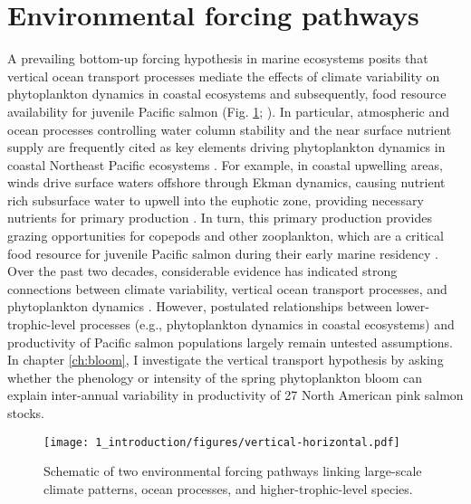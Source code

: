 

\section{Environmental forcing pathways}

A prevailing bottom-up forcing hypothesis in marine ecosystems posits that
vertical ocean transport processes mediate the effects of climate variability on
phytoplankton dynamics in coastal ecosystems and subsequently, food resource
availability for juvenile Pacific salmon (Fig. \ref{fig:intro:1};
\citealp{DiLorenzo2013b, Rykaczewski2008a, Ware1991a}). In particular,
atmospheric and ocean processes controlling water column stability and the near
surface nutrient supply are frequently cited as key elements driving
phytoplankton dynamics in coastal Northeast Pacific ecosystems
\citep{Henson2007a, Gargett1997a}. For example, in coastal upwelling areas,
winds drive surface waters offshore through Ekman dynamics, causing nutrient
rich subsurface water to upwell into the euphotic zone, providing necessary
nutrients for primary production \citep{Huyer1983}. In turn, this primary
production provides grazing opportunities for copepods and other zooplankton,
which are a critical food resource for juvenile Pacific salmon during their
early marine residency \citep{Armstrong2008a, Beauchamp2007a, Brodeur2007a}.
Over the past two decades, considerable evidence has indicated strong
connections between climate variability, vertical ocean transport processes, and
phytoplankton dynamics \citep{Chenillat2012, Polovina1995a, Henson2007a,
Henson2007b, Stabeno2004a, Weingartner2002a}. However, postulated relationships
between lower-trophic-level processes (e.g., phytoplankton dynamics in coastal
ecosystems) and productivity of Pacific salmon populations largely remain
untested assumptions. In chapter \ref{ch:bloom}, I investigate the vertical
transport hypothesis by asking whether the phenology or intensity of the spring
phytoplankton bloom can explain inter-annual variability in productivity of 27
North American pink salmon stocks.

\begin{figure}[htbp]
  \centering
  \texttt{[image: 1\_introduction/figures/vertical-horizontal.pdf]}
  \caption[Schematic of two environmental forcing pathways]{Schematic of two
           environmental forcing pathways linking large-scale climate patterns,
           ocean processes, and higher-trophic-level species.}
  \label{fig:intro:1}
\end{figure}

